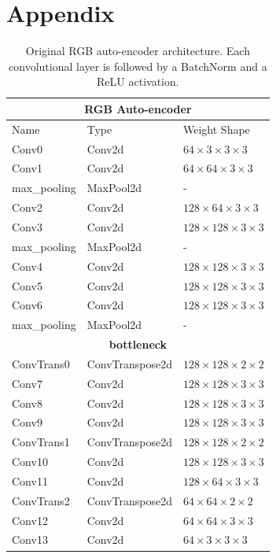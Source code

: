 \documentclass[10pt,twocolumn,letterpaper]{article}
\begin{document}
\clearpage
\appendix
\section{Appendix}
\begin{table}[hpbt]
	\centering
	\begin{tabular}{ | l | l | l | }
		\hline
		\multicolumn{3}{|c|}{\textbf{RGB Auto-encoder}} \\
		\hline \hline
		Name & Type & Weight Shape \\ \hline \hline
		Conv0 & Conv2d & $64\times3\times3\times3$ \\ \hline
		Conv1 & Conv2d & $64\times64\times3\times3$ \\ \hline
		max\_pooling & MaxPool2d & - \\ \hline
		Conv2 & Conv2d & $128\times64\times3\times3$ \\ \hline
		Conv3 & Conv2d & $128\times128\times3\times3$ \\ \hline
		max\_pooling & MaxPool2d & - \\ \hline
		Conv4 & Conv2d & $128\times128\times3\times3$ \\ \hline
		Conv5 & Conv2d & $128\times128\times3\times3$ \\ \hline
		Conv6 & Conv2d & $128\times128\times3\times3$ \\ \hline
		max\_pooling & MaxPool2d & - \\ \hline
		\multicolumn{3}{|c|}{\textbf{bottleneck}} \\ \hline
		ConvTrans0 & ConvTranspose2d & $128\times128\times2\times2$ \\ \hline
		Conv7 & Conv2d & $128\times128\times3\times3$ \\ \hline
		Conv8 & Conv2d & $128\times128\times3\times3$ \\ \hline
		Conv9 & Conv2d & $128\times128\times3\times3$ \\ \hline
		ConvTrans1 & ConvTranspose2d & $128\times128\times2\times2$ \\ \hline
		Conv10 & Conv2d & $128\times128\times3\times3$  \\ \hline
		Conv11 & Conv2d & $128\times64\times3\times3$  \\ \hline
		ConvTrans2 & ConvTranspose2d & $64\times64\times2\times2$ \\ \hline
		Conv12 & Conv2d & $64\times64\times3\times3$ \\ \hline
		Conv13 & Conv2d & $64\times3\times3\times3$ \\ \hline
	\end{tabular}
	\caption{\label{appendix:architecture} Original RGB auto-encoder architecture.
		Each convolutional layer is followed by a BatchNorm and a ReLU activation.}
\end{table}
\end{document}
